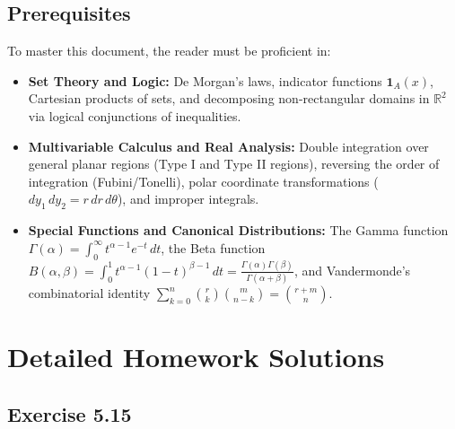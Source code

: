 \documentclass[11pt, letterpaper]{article}
\theoremstyle{definition}
\theoremstyle{remark}
\begin{document}
\subsection{Prerequisites}
To master this document, the reader must be proficient in:
\begin{itemize}
    \item \textbf{Set Theory and Logic:} De Morgan's laws, indicator functions $\mathbf{1}_A(x)$, Cartesian products of sets, and decomposing non-rectangular domains in $\mathbb{R}^2$ via logical conjunctions of inequalities.
    \item \textbf{Multivariable Calculus and Real Analysis:} Double integration over general planar regions (Type I and Type II regions), reversing the order of integration (Fubini/Tonelli), polar coordinate transformations ($dy_1 \, dy_2 = r \, dr \, d\theta$), and improper integrals.
    \item \textbf{Special Functions and Canonical Distributions:} The Gamma function $\Gamma(\alpha) = \int_0^\infty t^{\alpha-1} e^{-t} \, dt$, the Beta function $B(\alpha, \beta) = \int_0^1 t^{\alpha-1}(1-t)^{\beta-1} \, dt = \frac{\Gamma(\alpha)\Gamma(\beta)}{\Gamma(\alpha+\beta)}$, and Vandermonde's combinatorial identity $\sum_{k=0}^n \binom{r}{k}\binom{m}{n-k} = \binom{r+m}{n}$.
\end{itemize}

\newpage
\section{Detailed Homework Solutions}

\subsection{Exercise 5.15}
\end{document}
